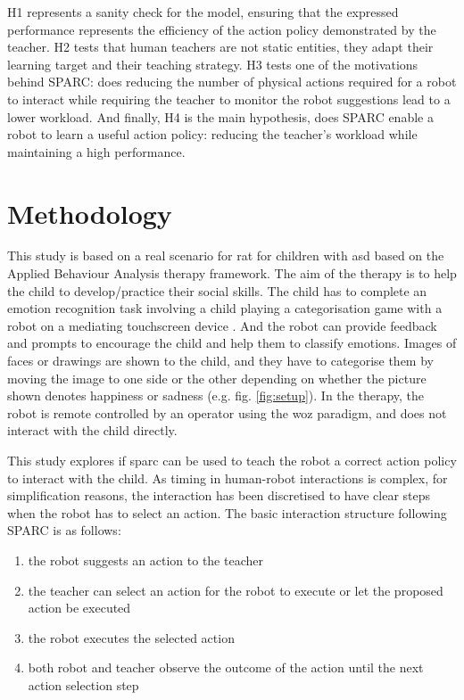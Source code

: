 H1 represents a sanity check for the model, ensuring that the expressed performance represents the efficiency of the action policy demonstrated by the teacher. H2 tests that human teachers are not static entities, they adapt their learning target and their teaching strategy. H3 tests one of the motivations behind SPARC: does reducing the number of physical actions required for a robot to interact while requiring the teacher to monitor the robot suggestions lead to a lower workload. And finally, H4 is the main hypothesis, does SPARC enable a robot to learn a useful action policy: reducing the teacher's workload while maintaining a high performance.

\section{Methodology}

This study is based on a real scenario for \gls{rat} for children with \gls{asd} based on the Applied Behaviour Analysis therapy framework. The aim of the therapy is to help the child to develop/practice their social skills. The child has to complete an emotion recognition task involving a child playing a categorisation game with a robot on a mediating touchscreen device \cite{baxter2012touchscreen}. And the robot can provide feedback and prompts to encourage the child and help them to classify emotions. Images of faces or drawings are shown to the child, and they have to categorise them by moving the image to one side or the other depending on whether the picture shown denotes happiness or sadness (e.g. fig. \ref{fig:setup}). In the therapy, the robot is remote controlled by an operator using the \acrlong{woz} paradigm, and does not interact with the child directly. 

This study explores if \gls{sparc} can be used to teach the robot a correct action policy to interact with the child. As timing in human-robot interactions is complex, for simplification reasons, the interaction has been discretised to have clear steps when the robot has to select an action. The basic interaction structure following SPARC is as follows: 
\begin{enumerate}
	\item the robot suggests an action to the teacher
	\item the teacher can select an action for the robot to execute or let the proposed action be executed
	\item the robot executes the selected action 
	\item both robot and teacher observe the outcome of the action until the next action selection step
\end{enumerate}

